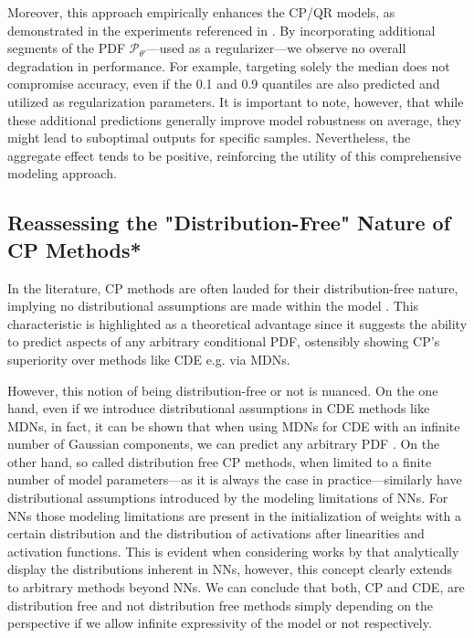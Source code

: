 Moreover, this approach empirically enhances the CP/QR models, as demonstrated in the experiments referenced in . By incorporating additional segments of the PDF $\mathcal{P}_{\theta'}$—used as a regularizer—we observe no overall degradation in performance. For example, targeting solely the median does not compromise accuracy, even if the 0.1 and 0.9 quantiles are also predicted and utilized as regularization parameters. It is important to note, however, that while these additional predictions generally improve model robustness on average, they might lead to suboptimal outputs for specific samples. Nevertheless, the aggregate effect tends to be positive, reinforcing the utility of this comprehensive modeling approach.


\subsection{Reassessing the "Distribution-Free" Nature of CP Methods*}

In the literature, CP methods are often lauded for their distribution-free nature, implying no distributional assumptions are made within the model \cite{angelopoulos2021gentle}. This characteristic is highlighted as a theoretical advantage since it suggests the ability to predict aspects of any arbitrary conditional PDF, ostensibly showing CP's superiority over methods like CDE e.g. via MDNs.

However, this notion of being distribution-free or not is nuanced. On the one hand, even if we introduce distributional assumptions in CDE methods like MDNs, in fact, it can be shown that when using MDNs for CDE with an infinite number of Gaussian components, we can predict any arbitrary PDF \cite{bishop1994mixture}. On the other hand, so called distribution free CP methods, when limited to a finite number of model parameters—as it is always the case in practice—similarly have distributional assumptions introduced by the modeling limitations of NNs. For NNs those modeling limitations are present in the initialization of weights with a certain distribution and the distribution of activations after linearities and activation functions. This is evident when considering works by \cite{klambauer2017self, ioffe2015batch} that analytically display the distributions inherent in NNs, however, this concept clearly extends to arbitrary methods beyond NNs. We can conclude that both, CP and CDE, are distribution free and not distribution free methods simply depending on the perspective if we allow infinite expressivity of the model or not respectively.

